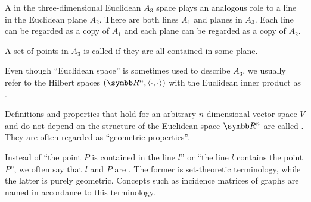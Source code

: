 \begin{remark}
\begin{remenum}
     A  in the three-dimensional Euclidean \( A_3 \) space plays an analogous role to a line in the Euclidean plane \( A_2 \). There are both lines \( A_1 \) and planes in \( A_3 \). Each line can be regarded as a copy of \( A_1 \) and each plane can be regarded as a copy of \( A_2 \).

     A set of points in \( A_3 \) is called  if they are all contained in some plane.

     Even though \enquote{Euclidean space} is sometimes used to describe \( A_3 \), we usually refer to the Hilbert spaces \( (\R^n, \Prod \cdot \cdot) \) with the Euclidean inner product as .

     Definitions and properties that hold for an arbitrary \( n \)-dimensional vector space \( V \) and do not depend on the structure of the Euclidean space \( \R^n \) are called . They are often regarded as \enquote{geometric properties}.

     Instead of \enquote{the point \( P \) is contained in the line \( l \)} or \enquote{the line \( l \) contains the point \( P \)}, we often say that \( l \) and \( P \) are . The former is set-theoretic terminology, while the latter is purely geometric. Concepts such as incidence matrices of graphs are named in accordance to this terminology.
  \end{remenum}
\end{remark}
